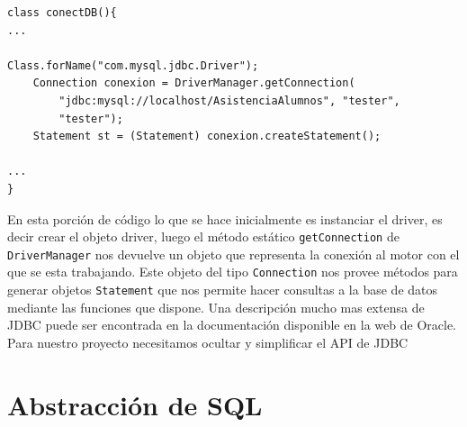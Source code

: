\begin{lstlisting}[title=Porción de codigo java para la conexión a una base de datos]
class conectDB(){
...

Class.forName("com.mysql.jdbc.Driver");
	Connection conexion = DriverManager.getConnection(
		"jdbc:mysql://localhost/AsistenciaAlumnos", "tester",
		"tester");
	Statement st = (Statement) conexion.createStatement();

...
}
\end{lstlisting}

En esta porción de código lo que se hace inicialmente es instanciar el driver, es decir crear el objeto driver, luego el método estático \verb=getConnection= de 	\verb=DriverManager= nos devuelve un objeto que representa la conexión al motor con el que se esta trabajando. Este objeto del tipo \verb=Connection= nos provee métodos para generar objetos \verb=Statement= que nos permite hacer consultas a la base de datos mediante las funciones que dispone. Una descripción mucho mas extensa de JDBC puede ser encontrada en la documentación disponible en la web de Oracle\citep{java:jdbc}.
Para nuestro proyecto necesitamos ocultar y simplificar el API de JDBC





\section{Abstracción de SQL}
